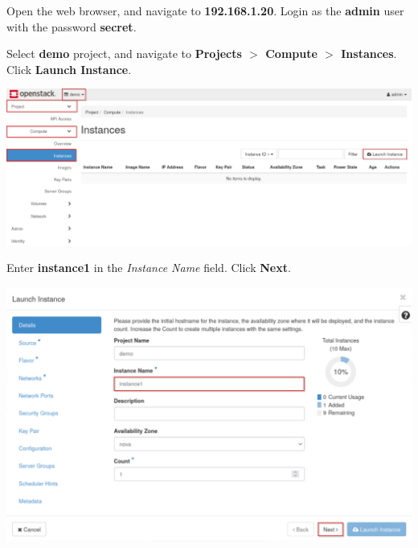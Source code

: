 \documentclass[letterpaper, 12pt]{article}
\begin{document}
\begin{enumerate}
    \begin{labstep}
        Open the web browser, and navigate to \textbf{192.168.1.20}.
        Login as the \textbf{admin} user with the password \textbf{secret}.
    \end{labstep}

    \begin{labstep}
        Select \textbf{demo} project, and navigate to \textbf{Projects $>$ Compute $>$ Instances}.
        Click \textbf{Launch Instance}.

        \begin{center}
            \includegraphics[width=\linewidth]{images/part4/step2.png}
        \end{center}
    \end{labstep}

    \begin{labstep}
        Enter \textbf{instance1} in the \textit{Instance Name} field.
        Click \textbf{Next}.

        \begin{center}
            \includegraphics[width=\linewidth]{images/part4/step3.png}
        \end{center}
    \end{labstep}


\end{enumerate}
\end{document}
